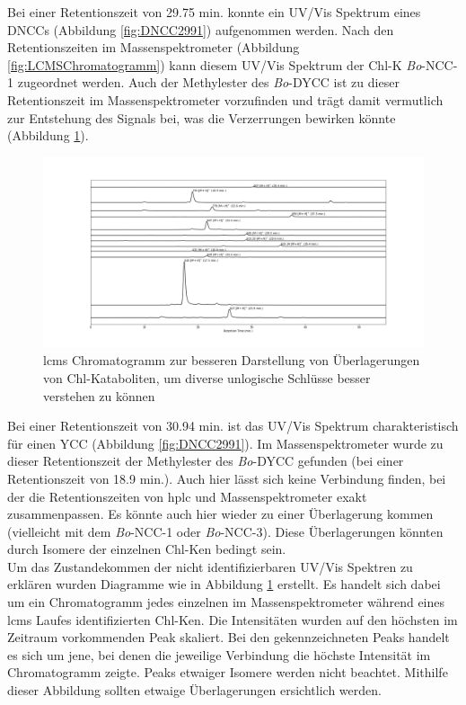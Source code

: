 Bei einer Retentionszeit von 29.75 min. konnte ein UV/Vis Spektrum eines \gls{DNCC}s (Abbildung \ref{fig:DNCC2991}) aufgenommen werden. Nach den Retentionszeiten im Massenspektrometer (Abbildung \ref{fig:LCMSChromatogramm}) kann diesem UV/Vis Spektrum der \gls{Chl-K} \textit{Bo}-NCC-1 zugeordnet werden. Auch der Methylester des \textit{Bo}-DYCC ist zu dieser Retentionszeit im Massenspektrometer vorzufinden und trägt damit vermutlich zur Entstehung des Signals bei, was die Verzerrungen bewirken könnte (Abbildung \ref{fig:LCMSChromatogrammAufspaltung}).

\begin{figure}[!htbp]
  \includegraphics[width=1.4\textwidth, center]{figures/Kapitel6/keineReaktion/Kuerbis_Analyse_keineReaktion2_LC-ESI-MS.png}
  \caption[LC-MS Chromatogramm vor der Reaktion - Aufspaltung der Signale, Quelle: Autor]{\gls{lcms} Chromatogramm zur besseren Darstellung von Überlagerungen von Chl-Kataboliten, um diverse unlogische Schlüsse besser verstehen zu können}
  \label{fig:LCMSChromatogrammAufspaltung}
\end{figure}

Bei einer Retentionszeit von 30.94 min. ist das UV/Vis Spektrum charakteristisch für einen \gls{YCC} (Abbildung \ref{fig:DNCC2991}). Im Massenspektrometer wurde zu dieser Retentionszeit der Methylester des \textit{Bo}-DYCC gefunden (bei einer Retentionszeit von 18.9 min.). Auch hier lässt sich keine Verbindung finden, bei der die Retentionszeiten von \gls{hplc} und Massenspektrometer exakt zusammenpassen. Es könnte auch hier wieder zu einer Überlagerung kommen (vielleicht mit dem \textit{Bo}-NCC-1 oder \textit{Bo}-NCC-3). Diese Überlagerungen könnten durch Isomere der einzelnen \gls{Chl-K}en bedingt sein. \\
 

Um das Zustandekommen der nicht identifizierbaren UV/Vis Spektren zu erklären wurden Diagramme wie in Abbildung \ref{fig:LCMSChromatogrammAufspaltung} erstellt. Es handelt sich dabei um ein Chromatogramm jedes einzelnen im Massenspektrometer während eines \gls{lcms} Laufes identifizierten \gls{Chl-K}en. Die Intensitäten wurden auf den höchsten im Zeitraum vorkommenden Peak skaliert. Bei den gekennzeichneten Peaks handelt es sich um jene, bei denen die jeweilige Verbindung die höchste Intensität im Chromatogramm zeigte. Peaks etwaiger Isomere werden nicht beachtet. Mithilfe dieser Abbildung sollten etwaige Überlagerungen ersichtlich werden. 

